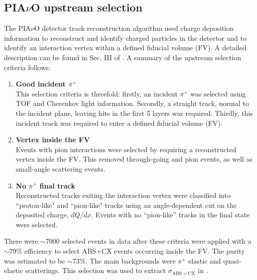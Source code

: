 \subsection{PIA$\nu$O upstream selection}
The PIA$\nu$O detector track reconstruction algorithm used charge deposition information to reconstruct and identify charged particles in the detector and to identify an interaction vertex within a defined fiducial volume (FV). A detailed description can be found in Sec. III of \cite{duet}. A summary of the upstream selection criteria follows:
\begin{enumerate}
\item {\bf Good incident $\pi^{+}$\\}
This selection criteria is threefold: firstly, an incident $\pi^{+}$ was selected using TOF and Cherenkov light information. Secondly, a straight track, normal to the incident plane, leaving hits in the first 5 layers was required. Thirdly, this incident track was required to enter a defined fiducial volume (FV).
\item {\bf Vertex inside the FV\\}
Events with pion interactions were selected by requiring a reconstructed vertex inside the FV. This removed through-going and pion events, as well as small-angle scattering events.
\item {\bf No $\pi^{+}$ final track\\}
Reconstructed tracks exiting the interaction vertex were classified into ``proton-like" and ``pion-like" tracks using an angle-dependent cut on the deposited charge, $dQ/dx$. Events with no ``pion-like'' tracks in the final state were selected.
\end{enumerate}
There were $\sim$7000 selected events in data after these criteria were applied with a $\sim$79\% efficiency to select ABS+CX events occurring inside the FV. The purity was estimated to be $\sim$73\%. The main backgrounds were $\pi^{+}$ elastic and quasi-elastic scatterings. This selection was used to extract $\sigma{_\mathrm{ABS+CX}}$ in \cite{duet}.

